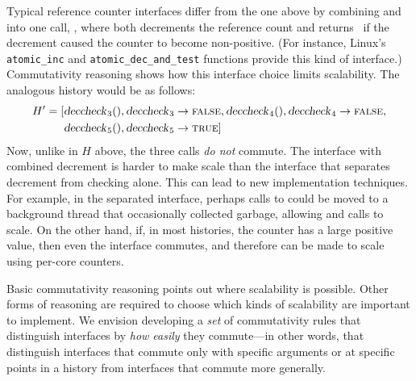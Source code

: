 Typical reference counter interfaces differ from the one above by
combining  and  into one call, , where
 both decrements the reference count and returns
\TRUE\ if the decrement caused the counter to become non-positive.
%
(For instance, Linux's \verb+atomic_inc+ and \verb+atomic_dec_and_test+
functions provide this kind of interface.)
%
Commutativity reasoning shows how this interface choice limits
scalability.
%
The analogous history would be as follows:
%
\begin{align*}
H' = [&\text{\textsl{deccheck}}_{3}(), \text{\textsl{deccheck}}_{3} \rightarrow \textsc{false},
	\text{\textsl{deccheck}}_{4}(), \text{\textsl{deccheck}}_{4} \rightarrow \textsc{false}, \\
&\text{\textsl{deccheck}}_{5}(), \text{\textsl{deccheck}}_{5} \rightarrow \textsc{true}]
\end{align*}
%
Now, unlike in $H$ above, the three  calls \emph{do not}
commute.
%
The interface with combined decrement is harder to make scale than
the interface that separates decrement from checking alone.
%
This can lead to new implementation techniques.
%
For example, in the separated interface, perhaps
calls to  could be moved to a background
thread that occasionally collected garbage, allowing  and
 calls to scale.
%
On the other hand, if, in most histories, the counter has a large
positive value, then even the  interface commutes, and
therefore can be made to scale using per-core counters.

Basic commutativity reasoning points out where scalability is possible.
%
Other forms of reasoning are required to choose which kinds of
scalability are important to implement.
%
We envision developing a \emph{set} of commutativity rules that
distinguish interfaces by \emph{how easily} they commute---in other
words, that distinguish interfaces that commute only with specific
arguments or at specific points in a history from interfaces that
commute more generally.


